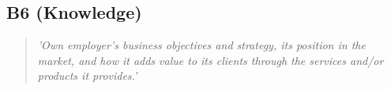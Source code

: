 \subsection*{B6 (Knowledge)}

  \begin{quote}
    \textit{'Own employer’s business objectives
    and strategy, its position in the market, and how it adds
    value to its clients through the services and/or products it
    provides.'}
  \end{quote}

\newpage
